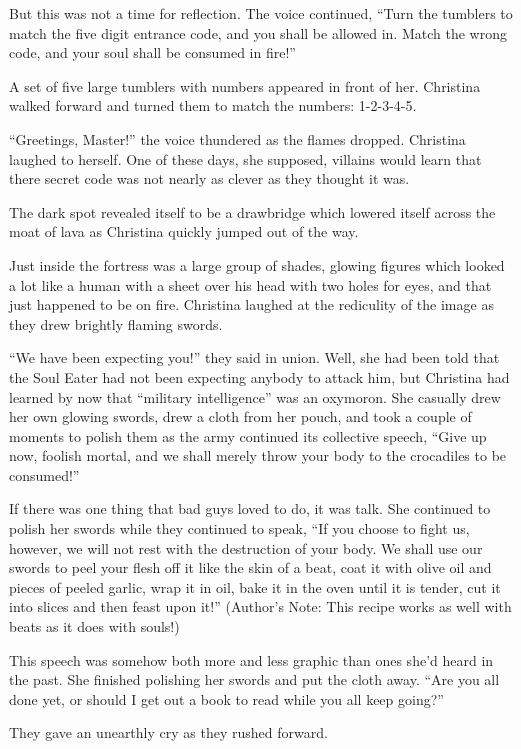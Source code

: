 \documentclass[showtrims,b6paper,draft,10pt]{memoir}
\begin{document}
But this was not a time for reflection.  The voice continued,  ``Turn the tumblers to match the five digit entrance code, and you shall be allowed in.  Match the wrong code, and your soul shall be consumed in fire!''

A set of five large tumblers with numbers appeared in front of her.  Christina walked forward and turned them to match the numbers: 1-2-3-4-5.

``Greetings, Master!'' the voice thundered as the flames dropped.  Christina laughed to herself.  One of these days, she supposed, villains would learn that there secret code was not nearly as clever as they thought it was.

The dark spot revealed itself to be a drawbridge which lowered itself across the moat of lava as Christina quickly jumped out of the way.

Just inside the fortress was a large group of shades, glowing figures which looked a lot like a human with a sheet over his head with two holes for eyes, and that just happened to be on fire.  Christina laughed at the rediculity of the image as they drew brightly flaming swords.

``We have been expecting you!'' they said in union.  Well, she had been told that the Soul Eater had not been expecting anybody to attack him, but Christina had learned by now that ``military intelligence'' was an oxymoron.  She casually drew her own glowing swords, drew a cloth from her pouch, and took a couple of moments to polish them as the army continued its collective speech, ``Give up now, foolish mortal, and we shall merely throw your body to the crocadiles to be consumed!''

If there was one thing that bad guys loved to do, it was talk.  She continued to polish her swords while they continued to speak,  ``If you choose to fight us, however, we will not rest with the destruction of your body.  We shall use our swords to peel your flesh off it like the skin of a beat, coat it with olive oil and pieces of peeled garlic, wrap it in oil, bake it in the oven until it is tender, cut it into slices and then feast upon it!''  (Author's Note:  This recipe works as well with beats as it does with souls!)

This speech was somehow both more and less graphic than ones she'd heard in the past.  She finished polishing her swords and put the cloth away.  ``Are you all done yet, or should I get out a book to read while you all keep going?''

They gave an unearthly cry as they rushed forward.
\end{document}
